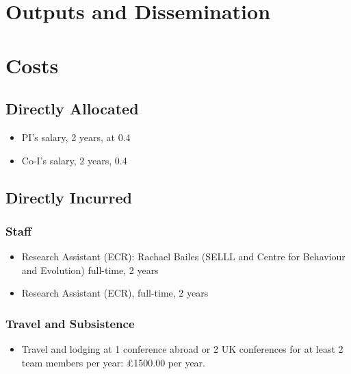 \documentclass[11pt]{article}
\begin{document}
\section{Outputs and Dissemination}

\section{Costs}

\subsection{Directly Allocated}

\begin{itemize}
	\item PI's salary, 2 years, at 0.4\\
	
	\item Co-I's salary, 2 years, 0.4\\
	
\end{itemize}


\subsection{Directly Incurred}

\subsubsection{Staff}

\begin{itemize}
	\item Research Assistant (ECR): Rachael Bailes (SELLL and Centre for Behaviour and Evolution) full-time, 2 years
	
	\item Research Assistant (ECR), full-time, 2 years
\end{itemize}


\subsubsection{Travel and Subsistence}

\begin{itemize}
	\item Travel and lodging at 1 conference abroad or 2 UK conferences for at least 2 team members per year: £1500.00 per year.
\end{itemize}
\end{document}
